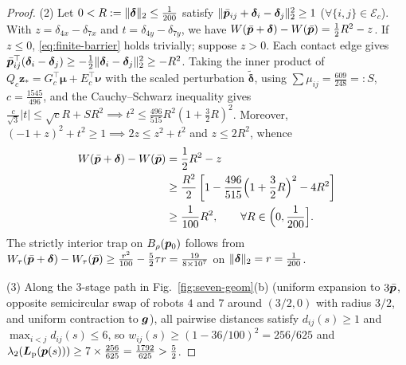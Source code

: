 \begin{proof}
(2) Let $0<R:=\lVert\boldsymbol\delta\rVert_2\le\frac1{200}$ satisfy $\lVert\bar{\boldsymbol{p}}_{ij}+\boldsymbol\delta_i-\boldsymbol\delta_j\rVert_2^2\ge 1$ ($\forall\{i,j\}\in\mathcal E_c$). With $z=\delta_{4x}-\delta_{7x}$ and $t=\delta_{4y}-\delta_{7y}$, we have $W(\bar{\boldsymbol{p}}+\boldsymbol\delta)-W(\bar{\boldsymbol{p}})=\frac12 R^2-z$. If $z\le 0$, \eqref{eq:finite-barrier} holds trivially; suppose $z>0$. Each contact edge gives $\bar{\boldsymbol{p}}_{ij}^{\top}(\boldsymbol\delta_i-\boldsymbol\delta_j)\ge -\frac12\lVert\boldsymbol\delta_i-\boldsymbol\delta_j\rVert_2^2\ge -R^2$. Taking the inner product of $Q_c\boldsymbol z_*=G_c^{\top}\boldsymbol\mu+E_c^{\top}\boldsymbol\nu$ with the scaled perturbation $\tilde{\boldsymbol\delta}$, using $\sum\mu_{ij}=\frac{609}{248}=:S$, $c=\frac{1545}{496}$, and the Cauchy--Schwarz inequality gives $\frac{c}{\sqrt{3}}|t|\le\sqrt{c}R+SR^2\implies t^2\le\frac{496}{515}R^2(1+\frac32 R)^2$. Moreover, $(-1+z)^2+t^2\ge 1\implies 2z\le z^2+t^2$ and $z\le 2R^2$, whence
\begin{equation}
\begin{split}
 W(\bar{\boldsymbol{p}}+\boldsymbol\delta)-W(\bar{\boldsymbol{p}})&=\frac12 R^2-z\\
 &\ge\frac{R^2}{2}\left[1-\frac{496}{515}\Big(1+\frac32 R\Big)^2-4R^2\right]\\
 &\ge\frac{1}{100}R^2,\qquad\forall R\in\Big(0,\frac1{200}\Big].
\end{split}
\end{equation}
The strictly interior trap on $B_\rho(\boldsymbol{p}_0)$ follows from $W_\tau(\bar{\boldsymbol{p}}+\boldsymbol\delta)-W_\tau(\bar{\boldsymbol{p}})\ge\frac{r^2}{100}-\frac52\tau r=\frac{19}{8\times 10^7}$ on $\lVert\boldsymbol\delta\rVert_2=r=\frac1{200}$.

(3) Along the 3-stage path in Fig.~\ref{fig:seven-geom}(b) (uniform expansion to $3\bar{\boldsymbol{p}}$, opposite semicircular swap of robots $4$ and $7$ around $(3/2,0)$ with radius $3/2$, and uniform contraction to $\boldsymbol{g}$), all pairwise distances satisfy $d_{ij}(s)\ge 1$ and $\max_{i<j}d_{ij}(s)\le 6$, so $w_{ij}(s)\ge(1-36/100)^2=256/625$ and $\lambda_2(\boldsymbol{L}_{\mathrm{p}}(\boldsymbol{p}(s)))\ge 7\times\frac{256}{625}=\frac{1792}{625}>\frac52$.
\end{proof}

